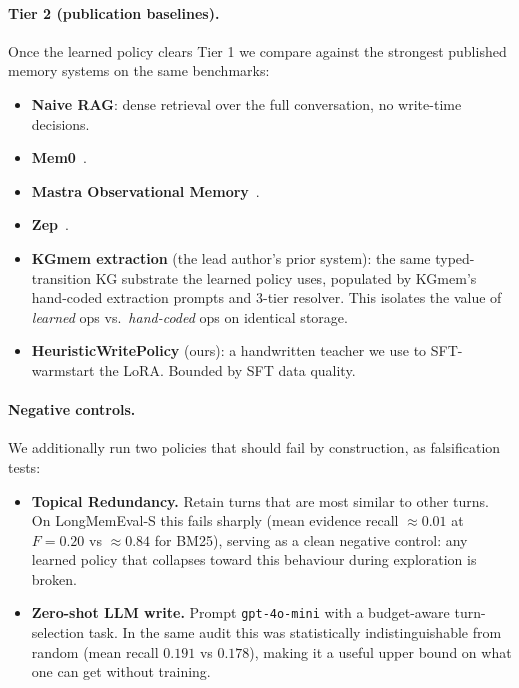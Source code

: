 \documentclass[11pt]{article}
\begin{document}
\paragraph{Tier 2 (publication baselines).} Once the learned policy
clears Tier 1 we compare against the strongest published memory
systems on the same benchmarks:
\begin{itemize}
  \item \textbf{Naive RAG}: dense retrieval over the full conversation,
    no write-time decisions.
  \item \textbf{Mem0}~\cite{chhikara2024mem0}.
  \item \textbf{Mastra Observational Memory}~\cite{mastra2025om}.
  \item \textbf{Zep}~\cite{rasmussen2024zep}.
  \item \textbf{KGmem extraction} (the lead author's prior system):
    the same typed-transition KG substrate the learned policy uses,
    populated by KGmem's hand-coded extraction prompts and 3-tier
    resolver. This isolates the value of \emph{learned} ops vs.\
    \emph{hand-coded} ops on identical storage.
  \item \textbf{HeuristicWritePolicy} (ours): a handwritten teacher
    we use to SFT-warmstart the LoRA. Bounded by SFT data quality.
\end{itemize}

\paragraph{Negative controls.} We additionally run two policies that
should fail by construction, as falsification tests:
\begin{itemize}
  \item \textbf{Topical Redundancy.} Retain turns that are most similar
    to other turns. On LongMemEval-S this fails sharply (mean evidence
    recall $\approx 0.01$ at $F = 0.20$ vs $\approx 0.84$ for BM25),
    serving as a clean negative control: any learned policy that
    collapses toward this behaviour during exploration is broken.
  \item \textbf{Zero-shot LLM write.} Prompt \texttt{gpt-4o-mini} with
    a budget-aware turn-selection task. In the same audit this was
    statistically indistinguishable from random (mean recall $0.191$
    vs $0.178$), making it a useful upper bound on what one can get
    without training.
\end{itemize}

\end{document}

